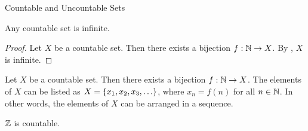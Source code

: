 \begin{section}{Countable and Uncountable Sets}
\bigskip

\begin{theorem} \label{thm:CountableSetIsInfinite}
    Any countable set is infinite.
\end{theorem}

\begin{proof}
    Let $X$ be a countable set. Then there exists a bijection $f: \mathbb{N} \to X$. By
    , $X$ is infinite.
\end{proof}

\bigskip

\begin{remark}
    Let $X$ be a countable set. Then there exists a bijection $f: \mathbb{N} \to X$. The elements of $X$
    can be listed as $X = \set*{x_1, x_2, x_3, \dots}$, where $x_n = f(n)$ for all $n \in \mathbb{N}$.
    In other words, the elements of $X$ can be arranged in a sequence.
\end{remark}

\bigskip

\begin{theorem} \label{thm:ZIsCountable}
    $\mathbb{Z}$ is countable.
\end{theorem}


\end{section}
